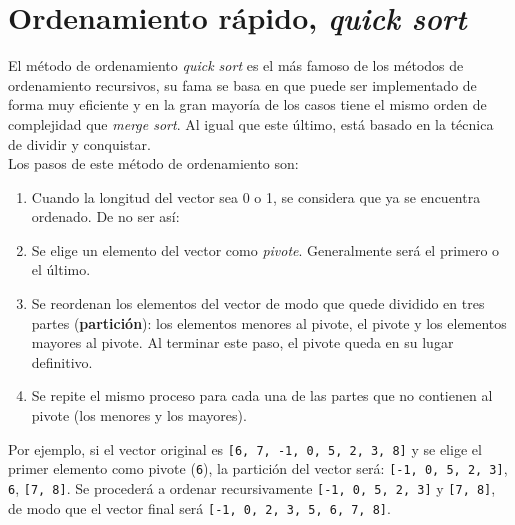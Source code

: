 
%

\renewcommand{\chaptermark}[1]{\markboth{#1}{}}
\renewcommand{\thesection}{\arabic{section}}
\chapter*{Ordenamiento rápido, \textit{quick sort}}

El método de ordenamiento \textit{quick sort} es el más famoso de los
métodos de ordenamiento recursivos, su fama se basa en que puede ser
implementado de forma muy eficiente y en la gran mayoría de los casos tiene
el mismo orden de complejidad que \textit{merge sort}.
Al igual que este último, está basado en la técnica de dividir y conquistar.\\

Los pasos de este método de ordenamiento son:
\begin{enumerate}
\item Cuando la longitud del vector sea 0 o 1, se considera que ya se
encuentra ordenado. De no ser así:
\item Se elige un elemento del vector como \textit{pivote}.  Generalmente
será el primero o el último.
\item Se reordenan los elementos del vector de modo que quede dividido en
tres partes (\textbf{partición}): los elementos menores al pivote, el pivote y los elementos
mayores al pivote. Al terminar este paso, el pivote
queda en su lugar definitivo.
\item Se repite el mismo proceso para cada una de las partes que no
contienen al pivote (los menores y los mayores).
\end{enumerate}

Por ejemplo, si el vector original es \verb+[6, 7, -1, 0, 5, 2, 3, 8]+ y se
elige el primer elemento como pivote (\verb!6!), la partición del vector
será: \verb![-1, 0, 5, 2, 3]!, \verb!6!, \verb![7, 8]!. Se procederá a
ordenar recursivamente \verb![-1, 0, 5, 2, 3]! y \verb![7, 8]!, de modo que
el vector final será \verb![-1, 0, 2, 3, 5, 6, 7, 8]!.

